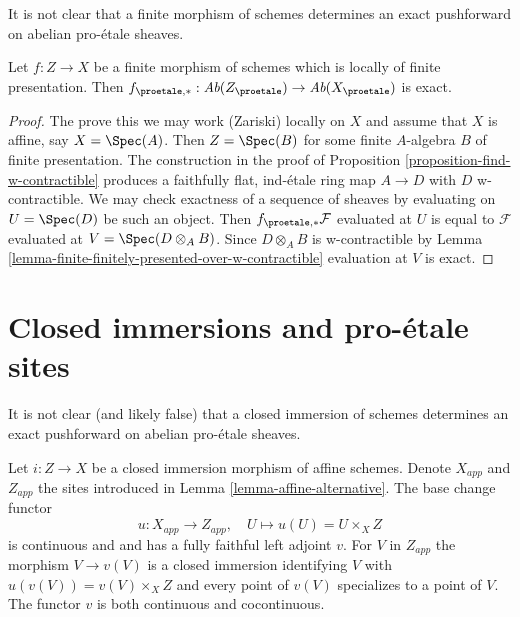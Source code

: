 \noindent
It is not clear that a finite morphism of schemes determines
an exact pushforward on abelian pro-\'etale sheaves.

\begin{lemma}
\label{lemma-finite}
Let $f : Z \to X$ be a finite morphism of schemes which is
locally of finite presentation. Then
$f_{\proetale, *} : \textit{Ab}(Z_\proetale) \to \textit{Ab}(X_\proetale)$
is exact.
\end{lemma}

\begin{proof}
The prove this we may work (Zariski) locally on $X$ and assume that $X$
is affine, say $X = \Spec(A)$. Then $Z = \Spec(B)$ for some finite
$A$-algebra $B$ of finite presentation. The construction in the proof of
Proposition \ref{proposition-find-w-contractible}
produces a faithfully flat, ind-\'etale ring map $A \to D$
with $D$ w-contractible. We may check exactness of a sequence of
sheaves by evaluating on $U = \Spec(D)$ be such an object. Then
$f_{\proetale, *}\mathcal{F}$
evaluated at $U$ is equal to $\mathcal{F}$ evaluated at
$V = \Spec(D \otimes_A B)$. Since $D \otimes_A B$ is w-contractible
by Lemma \ref{lemma-finite-finitely-presented-over-w-contractible}
evaluation at $V$ is exact.
\end{proof}








\section{Closed immersions and pro-\'etale sites}
\label{section-closed-immersion}

\noindent
It is not clear (and likely false) that a closed immersion of schemes
determines an exact pushforward on abelian pro-\'etale sheaves.

\begin{lemma}
\label{lemma-closed-immersion-affines}
Let $i : Z \to X$ be a closed immersion morphism of affine schemes.
Denote $X_{app}$ and $Z_{app}$ the sites introduced in
Lemma \ref{lemma-affine-alternative}.
The base change functor
$$
u : X_{app} \to Z_{app},\quad U \longmapsto u(U) = U \times_X Z
$$
is continuous and and has a fully faithful left adjoint $v$.
For $V$ in $Z_{app}$ the morphism $V \to v(V)$ is a closed immersion
identifying $V$ with $u(v(V)) = v(V) \times_X Z$ and every point of
$v(V)$ specializes to a point of $V$.
The functor $v$ is both continuous and cocontinuous.
\end{lemma}

